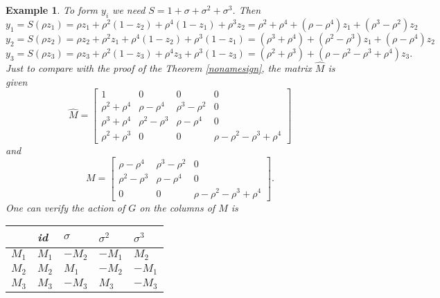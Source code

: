 \documentclass[12pt]{article}
\theoremstyle{plain}
\newtheorem{example}[theorem]{Example}
\begin{document}
\begin{example}
To form $y_i$ we need $S = 1+\sigma + \sigma^2 +\sigma ^3$. Then 
$$y_1 = S(\rho z_1) = \rho z_1 + \rho^2 (1-z_2) + \rho^4 (1-z_1) + \rho^3 z_2 = \rho^2+\rho^4 +(\rho - \rho^4)z_1 + (\rho^3 -\rho^2)z_2 $$ 
$$y_2 = S(\rho z_2) = \rho z_2 + \rho^2 z_1 + \rho^4 (1-z_2) + \rho^3 (1-z_1)= (\rho^3 + \rho^4) + (\rho^2 -\rho^3)z_1+ (\rho-\rho^4)z_2$$
$$y_3 = S(\rho z_3) = \rho z_3 + \rho^2 (1-z_3) + \rho^4 z_3 + \rho^3 (1-z_3)= (\rho^2+\rho^3) + (\rho-\rho^2-\rho^3+\rho^4)z_3.$$
Just to compare with the proof of the Theorem \ref{nonamesign}, the matrix $\hat{M}$ is given 
$$
\hat{M} = \begin{bmatrix}
1 & 0&0&0\\
\rho^2+\rho^4 & \rho -\rho^4 & \rho^3 -\rho^2 & 0\\
\rho^3+\rho^4 & \rho^2 -\rho^3 & \rho -\rho^4 &0 \\
\rho^2+\rho^3 &0 &0 & \rho - \rho^2 -\rho^3+\rho^4
\end{bmatrix}
$$
 and 
 $$
 M = \begin{bmatrix}
 \rho -\rho^4 & \rho^3 -\rho^2 & 0\\
 \rho^2 -\rho^3 & \rho -\rho^4 &0 \\
0 &0 & \rho - \rho^2 -\rho^3+\rho^4
\end{bmatrix}.
$$
One can verify the action of $G$ on the columns of $M$ is 
\begin{table}[H]
\centering
\begin{tabular}{l|llll} 
 & id & $\sigma$ & $\sigma^2$ & $\sigma^3$\\
 \hline
 $M_1$  & $M_1$ & $-M_2$ & $-M_1$ & $M_2$ \\
$M_2$ & $M_2$ & $M_1$ & $-M_2$ & $-M_1$ \\
$M_3$ & $M_3$ & $-M_3$ & $M_3$ & $-M_3$ \\
\end{tabular}
\end{table}
\end{example}




\end{document}
